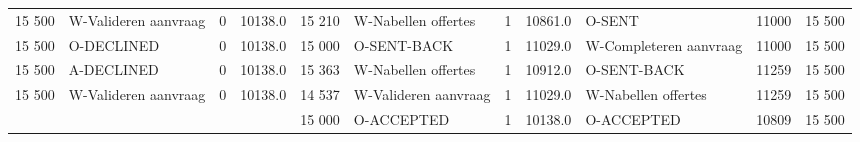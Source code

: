 \begin{tabular}{lllllllllll}
15 500 & W-Valideren aanvraag & 0 & 10138.0 & 15 210 & W-Nabellen offertes & 1 & 10861.0 & O-SENT & 11000 & 15 500 \\
15 500 & O-DECLINED & 0 & 10138.0 & 15 000 & O-SENT-BACK & 1 & 11029.0 & W-Completeren aanvraag & 11000 & 15 500 \\
15 500 & A-DECLINED & 0 & 10138.0 & 15 363 & W-Nabellen offertes & 1 & 10912.0 & O-SENT-BACK & 11259 & 15 500 \\
15 500 & W-Valideren aanvraag & 0 & 10138.0 & 14 537 & W-Valideren aanvraag & 1 & 11029.0 & W-Nabellen offertes & 11259 & 15 500 \\
 &  &  &  & 15 000 & O-ACCEPTED & 1 & 10138.0 & O-ACCEPTED & 10809 & 15 500 \\
\bottomrule
\end{tabular}
